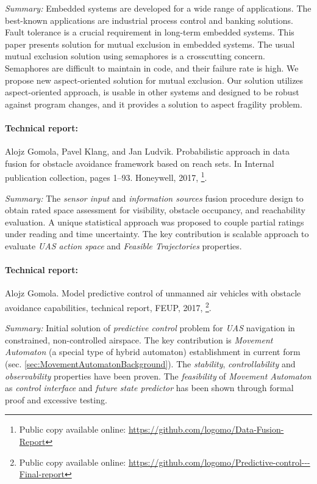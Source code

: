 \emph{Summary:} Embedded systems are developed for a wide range of applications. The best-known applications are industrial process control and banking solutions. Fault tolerance is a crucial requirement in long-term embedded systems. This paper presents solution for mutual exclusion in embedded systems. The usual mutual exclusion solution using semaphores is a crosscutting concern. Semaphores are difficult to maintain in code, and their failure rate is high. We propose new aspect-oriented solution for mutual exclusion. Our solution utilizes aspect-oriented approach, is usable in other systems and designed to be robust against program changes, and it provides a solution to aspect fragility problem.

\paragraph{Technical report:} Alojz Gomola, Pavel Klang, and Jan Ludvik. Probabilistic approach in data fusion for obstacle avoidance framework based on reach sets. In Internal publication collection, pages 1–93. Honeywell, 2017, \cite{gomola2017probabilistic}\footnote{Public copy available online: \url{https://github.com/logomo/Data-Fusion-Report}}.

\emph{Summary:} The \emph{sensor input} and \emph{information sources} fusion procedure design to obtain rated space assessment for visibility, obstacle occupancy, and reachability evaluation. A unique statistical approach was proposed to couple partial ratings under reading and time uncertainty. The key contribution is scalable approach to evaluate \emph{UAS action space} and \emph{Feasible Trajectories} properties. 

\paragraph{Technical report:}  Alojz Gomola. Model predictive control of unmanned air vehicles with obstacle avoidance capabilities, technical report, FEUP, 2017, \cite{gomola2017mpc}\footnote{Public copy available online: \url{https://github.com/logomo/Predictive-control---Final-report}}.

\emph{Summary:} Initial solution of \emph{predictive control} problem for \emph{UAS} navigation in constrained, non-controlled airspace. The key contribution is \emph{Movement Automaton} (a special type of hybrid automaton) establishment in current form (sec. \ref{sec:MovementAutomatonBackground}). The \emph{stability}, \emph{controllability} and \emph{observability} properties have been proven. The \emph{feasibility} of \emph{Movement Automaton} as \emph{control interface} and \emph{future state predictor} has been shown through formal proof and excessive testing.

